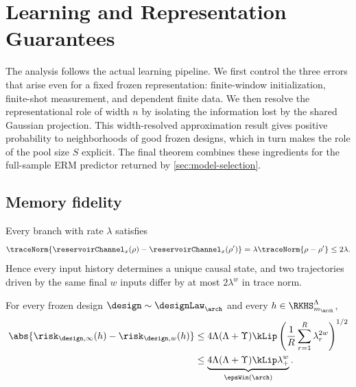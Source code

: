\section{Learning and Representation Guarantees}
\label{sec:theory}

The analysis follows the actual learning pipeline.  We first control the three
errors that arise even for a fixed frozen representation: finite-window
initialization, finite-shot measurement, and dependent finite data.  We then
resolve the representational role of width $n$ by isolating the information
lost by the shared Gaussian projection.  This width-resolved approximation
result gives positive probability to neighborhoods of good frozen designs,
which in turn makes the role of the pool size $S$ explicit.  The final theorem
combines these ingredients for the full-sample ERM predictor returned by
\cref{sec:model-selection}.

\subsection{Memory fidelity}
\label{sec:memory-fidelity}

\begin{lemma}
\label{lem:exact-contraction}
Every branch with rate $\lambda$ satisfies
\begin{equation}
    \traceNorm{\reservoirChannel_x(\rho)-\reservoirChannel_x(\rho')}
    =\lambda\traceNorm{\rho-\rho'}\leq2\lambda.
    \label{eq:exact-trace-contraction}
\end{equation}
Hence every input history determines a unique causal state, and two
trajectories driven by the same final $w$ inputs differ by at most
$2\lambda^w$ in trace norm.
\end{lemma}

\begin{proposition}
\label{prop:window-certificate}
For every frozen design $\design\sim\designLaw_{\arch}$ and every
$h\in\RKHS_{m_{\arch}}^\Lambda$,
\begin{equation}
\begin{aligned}
    \abs{\risk_{\design,\infty}(h)-\risk_{\design,w}(h)}
    &\leq
    4\Lambda(\Lambda+\Upsilon)\kLip
    \left(\frac1R\sum_{r=1}^{R}\lambda_r^{2w}\right)^{1/2}\\
    &\leq
    \underbrace{4\Lambda(\Lambda+\Upsilon)\kLip
      \lambda_+^w}_{\epsWin(\arch)}.
\end{aligned}
    \label{eq:window-risk-bound}
\end{equation}
\end{proposition}

